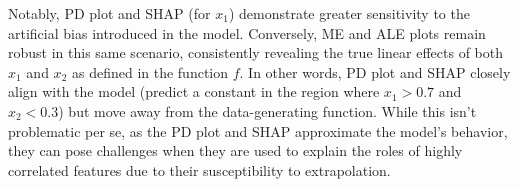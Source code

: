 Notably, \gls{PD} plot and \gls{SHAP} (for \(x_1\)) demonstrate greater sensitivity to the artificial bias introduced in the model. Conversely, \gls{ME} and \gls{ALE} plots remain robust in this same scenario, consistently revealing the true linear effects of both $x_1$ and $x_2$ as defined in the function \(f\).  In other words, \gls{PD} plot and \gls{SHAP}  closely align with the model (predict a constant in the region where $x_1 > 0.7$ and $x_2 <0.3 $) but move away from the data-generating function. While this isn't problematic per se, as the \gls{PD} plot and SHAP approximate the model's behavior, they can pose challenges when they are used to explain the roles of highly correlated features due to their susceptibility to extrapolation.






